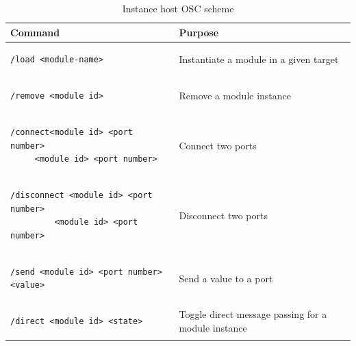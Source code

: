 \documentclass{article}
\newcommand\T{\rule{0pt}{2.6ex}}
\newcommand\TT{\rule{0pt}{3.6ex}}
\newcommand\B{\rule[-1.2ex]{0pt}{0pt}}
\newcommand\BB{\rule[-2.2ex]{0pt}{0pt}}
\begin{document}
\begin{table}
\begin{center}
\begin{tabular}{|p{25em}|p{21.5em}|}
\hline
\textbf{Command} \T \B & \textbf{Purpose} \\
\hline
\begin{minipage}[0pt]{20em}
\small {
\begin{verbatim}/load <module-name>\end{verbatim}} \end{minipage} \T & \small{Instantiate a module in a given target} \\
\hline
\begin{minipage}[0pt]{20em}
  \small {
\begin{verbatim}
/remove <module id>
\end{verbatim} 
}
 \end{minipage} \T
& \small{Remove a module instance} \\
\hline
\begin{minipage}[0pt]{20em}
\small {
\begin{verbatim}
/connect<module id> <port number> 
     <module id> <port number> 
\end{verbatim} 
}
 \end{minipage} \TT
& \small{Connect two ports} \BB \\
\hline
\begin{minipage}[0pt]{20em}
\small {
\begin{verbatim}
/disconnect <module id> <port number> 
         <module id> <port number> 
\end{verbatim}
}
 \end{minipage} \TT
& \small{Disconnect two ports} \BB \\
\hline
\begin{minipage}[0pt]{20em}
\small {
\begin{verbatim}/send <module id> <port number> <value> 
\end{verbatim} 
}
 \end{minipage} \T
& \small{Send a value to a port} \\
\hline
\begin{minipage}[0pt]{20em}
\small {
\begin{verbatim}
/direct <module id> <state> \end{verbatim}
} \end{minipage} \T
& \small{Toggle direct message passing for a module instance} \BB \\ 
\hline
\end{tabular} 
\end{center}
\caption{Instance host OSC scheme}
\label{tab:lib_namespace}
\end{table}
\end{document}

